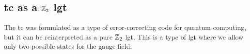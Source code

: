 %
%
%


%
%
\subsection{\acl{tc} as a \texorpdfstring{$\mathbb{Z}_2$}{Z2} \acs{lgt}}
\label{sub:toric_code_as_a_z2_lattice_gauge_theory}

The \ac{tc} was formulated as a type of error-correcting code for quantum computing, but it can be reinterpreted as a pure $\mathbb{Z}_2$ \ac{lgt}.
This is a type of \ac{lgt} where we allow only two possible states for the gauge field.

